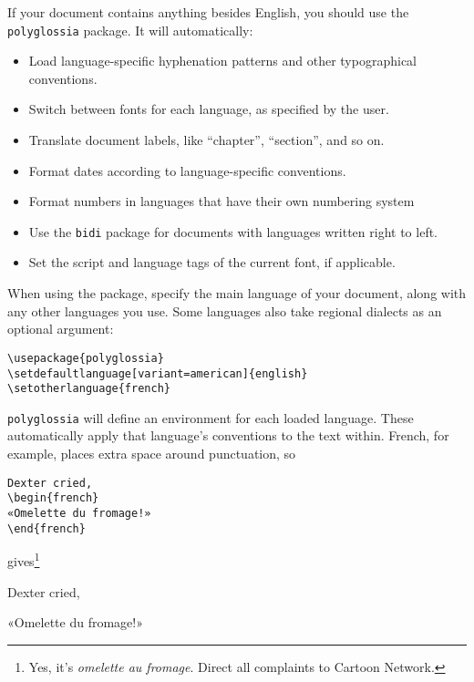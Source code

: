If your document contains anything besides English,
you should use the \texttt{polyglossia} package.
It will automatically:
\begin{itemize}
\item Load language-specific hyphenation patterns and other typographical
    conventions.
\item Switch between fonts for each language, as specified by the user.
\item Translate document labels,
    like ``chapter''\quotekern, ``section''\quotekern, and so on.
\item Format dates according to language-specific conventions.
\item Format numbers in languages that have their own numbering system
\item Use the \texttt{bidi} package for documents with languages written
    right to left.
\item Set the script and language tags of the current font, if applicable.
\end{itemize}
When using the package, specify the main language of your document,
along with any other languages you use.
Some languages also take regional dialects as an optional argument:
\begin{leftfigure}
\begin{lstlisting}
\usepackage{polyglossia}
\setdefaultlanguage[variant=american]{english}
\setotherlanguage{french}
\end{lstlisting}
\end{leftfigure}
\texttt{polyglossia} will define an environment for each loaded language.
These automatically apply that language's conventions to the text within.
French, for example, places extra space around punctuation, so
\begin{leftfigure}
\begin{lstlisting}
Dexter cried,
\begin{french}
«Omelette du fromage!»
\end{french}
\end{lstlisting}
\end{leftfigure}
gives\footnote{Yes, it's \emph{omelette au fromage}.
Direct all complaints to Cartoon Network.}
\begin{leftfigure}
\lm%
Dexter cried,
\begin{french}
\lm%
«Omelette du fromage!»
\end{french}
\end{leftfigure}


